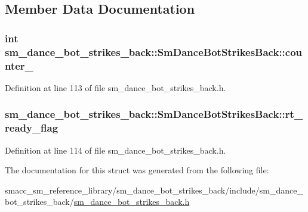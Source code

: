 \subsection{Member Data Documentation}
\subsubsection[{\texorpdfstring{counter\+\_\+1}{counter_1}}]{\setlength{\rightskip}{0pt plus 5cm}int sm\+\_\+dance\+\_\+bot\+\_\+strikes\+\_\+back\+::\+Sm\+Dance\+Bot\+Strikes\+Back\+::counter\+\_}\hypertarget{structsm__dance__bot__strikes__back_1_1SmDanceBotStrikesBack_a0cf56e316022dde4b3da552ab9f68513}{}\label{structsm__dance__bot__strikes__back_1_1SmDanceBotStrikesBack_a0cf56e316022dde4b3da552ab9f68513}


Definition at line 113 of file sm\+\_\+dance\+\_\+bot\+\_\+strikes\+\_\+back.\+h.

\subsubsection[{\texorpdfstring{rt\+\_\+ready\+\_\+flag}{rt_ready_flag}}]{ sm\+\_\+dance\+\_\+bot\+\_\+strikes\+\_\+back\+::\+Sm\+Dance\+Bot\+Strikes\+Back\+::rt\+\_\+ready\+\_\+flag}\hypertarget{structsm__dance__bot__strikes__back_1_1SmDanceBotStrikesBack_a609265a94c2575580fbb014f551a066a}{}\label{structsm__dance__bot__strikes__back_1_1SmDanceBotStrikesBack_a609265a94c2575580fbb014f551a066a}


Definition at line 114 of file sm\+\_\+dance\+\_\+bot\+\_\+strikes\+\_\+back.\+h.



The documentation for this struct was generated from the following file\+:\begin{DoxyCompactItemize}
\item 
smacc\+\_\+sm\+\_\+reference\+\_\+library/sm\+\_\+dance\+\_\+bot\+\_\+strikes\+\_\+back/include/sm\+\_\+dance\+\_\+bot\+\_\+strikes\+\_\+back/\hyperlink{sm__dance__bot__strikes__back_8h}{sm\+\_\+dance\+\_\+bot\+\_\+strikes\+\_\+back.\+h}\end{DoxyCompactItemize}
